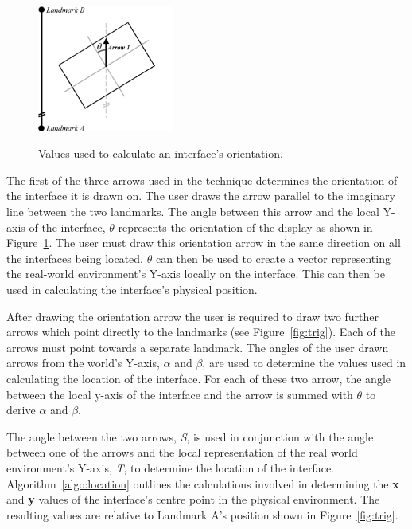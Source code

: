 \documentclass{bmcart}
\begin{document}
\begin{figure}[h]
   \centering
   \caption{Values used to calculate an interface's orientation.}
   \includegraphics[width=0.4\textwidth]{figures/orientation_maths.png}
   \label{fig:orienTrig}
\end{figure}

The first of the three arrows used in the technique determines the orientation of the interface it is drawn on.
The user draws the arrow parallel to the imaginary line between the two landmarks.
The angle between this arrow and the local Y-axis of the interface, $\theta$ represents the orientation of the display as shown in Figure~\ref{fig:orienTrig}.
The user must draw this orientation arrow in the same direction on all the interfaces being located.
\textbf{$\theta$} can then be used to create a vector representing the real-world environment's Y-axis locally on the interface.
This can then be used in calculating the interface's physical position.

After drawing the orientation arrow the user is required to draw two further arrows which point directly to the landmarks (see Figure~\ref{fig:trig}).
Each of the arrows must point towards a separate landmark.
The angles of the user drawn arrows from the world's Y-axis, $\alpha$ and $\beta$, are used to determine the values used in calculating the location of the interface.
For each of these two arrow, the angle between the local y-axis of the interface and the arrow is summed with $\theta$ to derive $\alpha$ and $\beta$.

The angle between the two arrows, \textit{S}, is used in conjunction with the angle between one of the arrows and the local representation of the real world environment's Y-axis, \textit{T}, to determine the location of the interface.
Algorithm~\ref{algo:location} outlines the calculations involved in determining the \textbf{x} and \textbf{y} values of the interface's centre point in the physical environment.
The resulting values are relative to Landmark A's position shown in Figure~\ref{fig:trig}.
\end{document}
